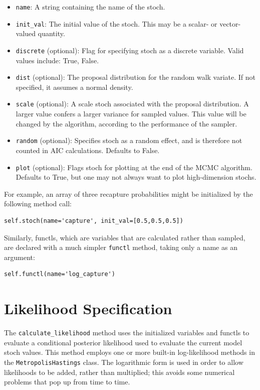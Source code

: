 \documentclass[]{book}
\begin{document}
\begin{itemize}

\item \verb=name=: A string containing the name of the stoch.
\item \verb=init_val=: The initial value of the stoch. This may be a scalar- or vector-valued quantity.
\item \verb=discrete= (optional): Flag for specifying stoch as a discrete variable. Valid values include: True, False.
\item \verb=dist= (optional): The proposal distribution for the random walk variate. If not specified, it assumes a normal density.
\item \verb=scale= (optional): A scale stoch associated with the proposal distribution. A larger value confers a larger variance for sampled values. This value will be changed by the algorithm, according to the performance of the sampler.
\item \verb=random= (optional): Specifies stoch as a random effect, and is therefore not counted in AIC calculations. Defaults to False.
\item \verb=plot= (optional): Flags stoch for plotting at the end of the MCMC algorithm. Defaults to True, but one may not always want to plot high-dimension stochs.
\end{itemize}
For example, an array of three recapture probabilities might be initialized by the following method call:
\begin{verbatim}
self.stoch(name='capture', init_val=[0.5,0.5,0.5])
\end{verbatim}

Similarly, functls, which are variables that are calculated rather than sampled, are declared with a much simpler \verb=functl= method, taking only a name as an argument:
\begin{verbatim}
self.functl(name='log_capture')
\end{verbatim}

\section{Likelihood Specification}\label{sec:likelihood_specification}

The \verb=calculate_likelihood= method uses the initialized variables and functls to evaluate a conditional posterior likelihood used to evaluate the current model stoch values. This method employs one or more built-in log-likelihood methods in the \verb=MetropolisHastings= class. The logarithmic form is used in order to allow likelihoods to be added, rather than multiplied; this avoids some numerical problems that pop up from time to time.
\end{document}
